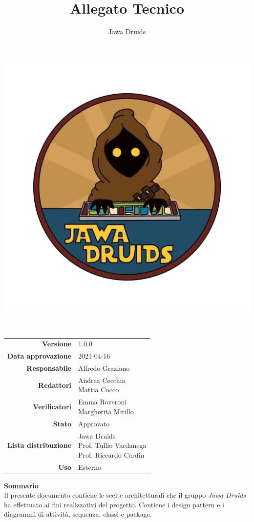 


	\makeatletter
	\begin{titlepage}
		\begin{center}
			\vspace*{-4,0cm}
			\author{Jawa Druids}
			\title{Allegato Tecnico}
			\date{}
			\includegraphics[width=0.5\linewidth]{../immagini/DRUIDSLOGO.jpg}\\[4ex]

			
			{\huge \bfseries  \@title }\\[2ex] 
			{\LARGE  \@author}\\[50ex]
			\vspace*{-9,0cm}
			\begin{table}[H]
			\renewcommand{\arraystretch}{1.4}
			\centering
			\begin{tabular}{r | l}
				\textbf{Versione} & 1.0.0 \\%
				\textbf{Data approvazione} & 2021-04-16\\
				\textbf{Responsabile} & Alfredo Graziano \\
				\textbf{Redattori} & \makecell[tl]{Andrea Cecchin \\ Mattia Cocco} \\		
				\textbf{Verificatori} & \makecell[tl]{Emma Roveroni \\ Margherita Mitillo} \\
				\textbf{Stato} & Approvato\\
				\textbf{Lista distribuzione} & \makecell[tl]{Jawa Druids \\ Prof. Tullio Vardanega \\ Prof. Riccardo Cardin}\\
				\textbf{Uso} & Esterno     
			\end{tabular}
		\end{table}
		\vspace{0.1cm}
		\hfill \break
		\fontsize{17}{10}\textbf{Sommario} \\
		\vspace{0.1cm}
		Il presente documento contiene le scelte architetturali che il gruppo \emph{\normalsize{\textit{Jawa Druids}}} ha effettuato ai fini realizzativi del progetto. Contiene i design pattern e i diagrammi di attività, sequenza, classi e package.
		\end{center}
	\end{titlepage}
	\makeatother
	
	
	\tableofcontents{}
	\listoftables{}
	\listoffigures{}
	
	
	
	
